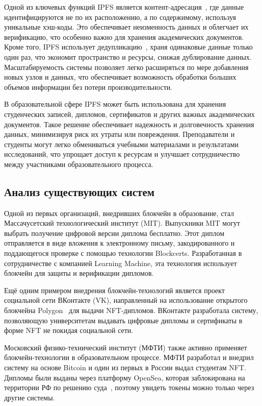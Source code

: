 Одной из ключевых функций IPFS является контент-адресация~\cite{bib:ipfs_2}, где данные идентифицируются не по их расположению, а по содержимому, используя уникальные хэш-коды. Это обеспечивает неизменность данных и облегчает их верификацию, что особенно важно для хранения академических документов. Кроме того, IPFS использует дедупликацию~\cite{bib:dedup}, храня одинаковые данные только один раз, что экономит пространство и ресурсы, снижая дублирование данных. Масштабируемость системы позволяет легко расширяться по мере добавления новых узлов и данных, что обеспечивает возможность обработки больших объемов информации без потери производительности.

В образовательной сфере IPFS может быть использована для хранения студенческих записей, дипломов, сертификатов и других важных академических документов. Такое решение обеспечивает надежность и долговечность хранения данных, минимизируя риск их утраты или повреждения. Преподаватели и студенты могут легко обмениваться учебными материалами и результатами исследований, что упрощает доступ к ресурсам и улучшает сотрудничество между участниками образовательного процесса.

\subsection{Анализ существующих систем}

Одной из первых организаций, внедривших блокчейн в образование, стал Массачусетский технологический институт (MIT). Выпускники MIT могут выбрать получение цифровой версии диплома бесплатно. Этот диплом отправляется в виде вложения к электронному письму, закодированного и поддающегося проверке с помощью технологии Blockcerts. Разработанная в сотрудничестве с компанией Learning Machine, эта технология использует блокчейн для защиты и верификации дипломов.~\cite{bib:mit_diplomas}

Ещё одним примером внедрения блокчейн-технологий является проект социальной сети ВКонтакте (VK), направленный на использование открытого блокчейна Polygon~\cite{bib:polygon} для выдачи NFT-дипломов. ВКонтакте разработала систему, позволяющую университетам выдавать цифровые дипломы и сертификаты в форме NFT не покидая социальной сети.~\cite{bib:vk_nft_diploma}

Московский физико-технический институт (МФТИ) также активно применяет блокчейн-технологии в образовательном процессе. МФТИ разработал и внедрил систему на основе Bitcoin и один из первых в России выдал студентам NFT. Дипломы были выданы через платформу OpenSea, которая заблокирована на территории РФ по решению суда~\cite{bib:opensea_block}, поэтому увидеть токены можно только через другие системы.~\cite{bib:mipt_nft_diploma}

